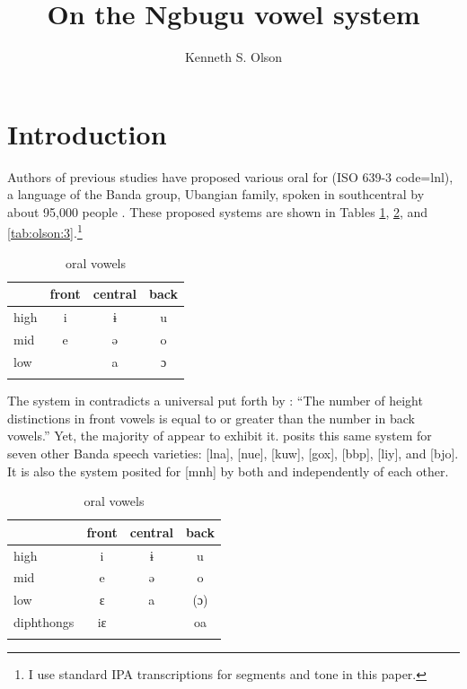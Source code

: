 \documentclass[output=paper,colorlinks,citecolor=brown]{langscibook}
\title{On the Ngbugu vowel system}
\author{Kenneth S. Olson\affiliation{SIL International}
}
\begin{document}
\maketitle

\section{Introduction}\label{sec:olson:1}

Authors of previous studies have proposed various oral  for  (ISO 639-3 code=lnl), a language of the Banda  group, Ubangian  family, spoken in southcentral  by about 95,000 people \citep{SimonsFennig2018}. These proposed systems are shown in Tables \ref{tab:olson:1}, \ref{tab:olson:2}, and \ref{tab:olson:3}.\footnote{I use standard IPA transcriptions for segments and tone in this paper.}

\begin{table}
\caption{ oral vowels \citep[13--14]{Cloarec-Heiss1978}}
\label{tab:olson:1}
    \begin{tabular}{lccc}
    \lsptoprule
                & front & central & back\\
    \midrule
        high    & i     & ɨ       & u\\
        mid     & e     & ə       & o\\
        low     &       & a       & ɔ\\
    \lspbottomrule
    \end{tabular}
\end{table}

The system in  contradicts a universal  put forth by \citet[122]{Crothers1978}: “The number of height  distinctions in front vowels is equal to or greater than the number in back vowels.” Yet, the majority of  appear to exhibit it. \citet[13--16]{Cloarec-Heiss1978} posits this same system for seven other Banda  speech varieties:  [lna],  [nue],  [kuw],  [gox],  [bbp],  [liy], and  [bjo]. It is also the system posited for  [mnh] by both \citet{Kamanda-Kola2003} and \citet{Olson2005} independently of each other.

\begin{table}
\caption{ oral vowels \citep[43]{Théret-Kieschke1998}}
\label{tab:olson:2}
    \begin{tabular}{lccc}
    \lsptoprule
                    & front & central & back\\
    \midrule
        high        & i     & ɨ       & u\\
        mid         & e     & ə       & o\\
        low         & ɛ     & a       & (ɔ)\\
        diphthongs  & iɛ    &         & oa\\
    \lspbottomrule
    \end{tabular}
\end{table}
\end{document}
